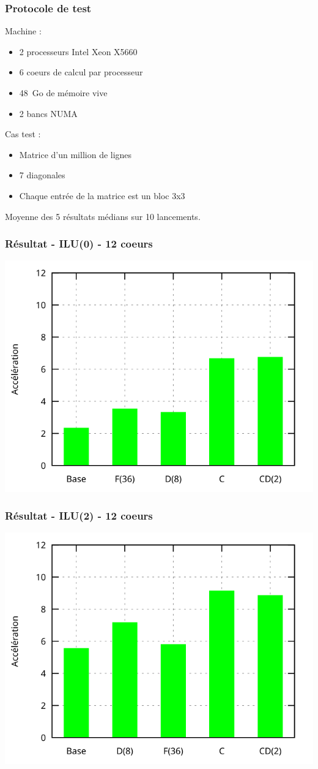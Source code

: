 \documentclass{beamer}
\begin{document}
\begin{frame}
  \frametitle{Protocole de test}
  Machine :
  \begin{itemize}
    \item 2 processeurs Intel Xeon X5660
    \item 6 coeurs de calcul par processeur
    \item 48~Go de mémoire vive
    \item 2 bancs NUMA
  \end{itemize}

  Cas test :
  \begin{itemize}
    \item Matrice d'un million de lignes
    \item 7 diagonales
    \item Chaque entrée de la matrice est un bloc 3x3
  \end{itemize}

  Moyenne des 5 résultats médians sur 10 lancements.

\end{frame}

\begin{frame}
  \frametitle{Résultat - ILU(0) - 12 coeurs}
  \centerline{\includegraphics[width=0.8\linewidth]{res_ilu0}}
\end{frame}


\begin{frame}
  \frametitle{Résultat - ILU(2) - 12 coeurs}
  \centerline{\includegraphics[width=0.8\linewidth]{res_iluk}}
\end{frame}
\end{document}
